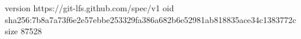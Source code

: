 version https://git-lfs.github.com/spec/v1
oid sha256:7b8a7a73f6e2e57ebbe253329fa386a682b6e52981ab818835ace34c1383772c
size 87528
